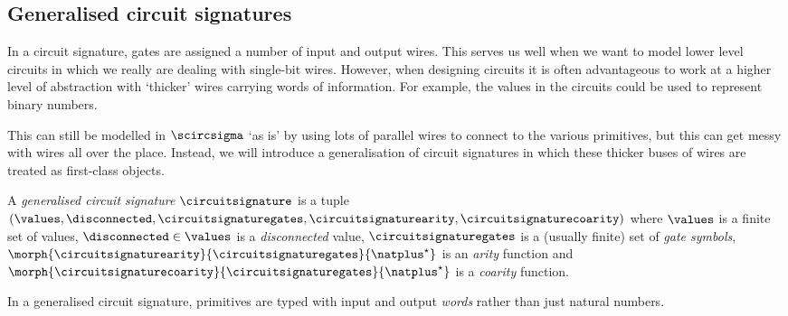 \documentclass{lmcs}
\begin{document}
\subsection{Generalised circuit signatures}

In a circuit signature, gates are assigned a number of input and output wires.
This serves us well when we want to model lower level circuits in which we
really are dealing with single-bit wires.
However, when designing circuits it is often advantageous to work at a higher
level of abstraction with `thicker' wires carrying words of information.
For example, the values in the circuits could be used to represent binary
numbers.

This can still be modelled in \(\scircsigma\) `as is' by using lots of parallel
wires to connect to the various primitives, but this can get messy with wires
all over the place.
Instead, we will introduce a generalisation of circuit signatures in which these
thicker buses of wires are treated as first-class objects.

\begin{defi}
    A \emph{generalised circuit signature} \(\circuitsignature\) is a tuple \((
    \values,
    \disconnected,
    \circuitsignaturegates,
    \circuitsignaturearity,
    \circuitsignaturecoarity
    )\) where \(\values\) is a finite set of values, \(
    \disconnected \in \values
    \) is a \emph{disconnected} value, \(\circuitsignaturegates\) is a (usually
    finite) set of \emph{gate symbols}, \(
    \morph{\circuitsignaturearity}{\circuitsignaturegates}{\natplus^\star}
    \) is an \emph{arity} function and \(
    \morph{\circuitsignaturecoarity}{\circuitsignaturegates}{\natplus^\star}
    \) is a \emph{coarity} function.
\end{defi}

In a generalised circuit signature, primitives are typed with input and output
\emph{words} rather than just natural numbers.
\end{document}
